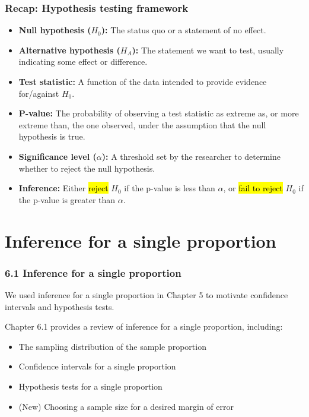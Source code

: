 \documentclass[t,compress,mathserif]{beamer}
\begin{document}
\begin{frame}
\frametitle{Recap: Hypothesis testing framework}

\begin{itemize}
\item \textbf{Null hypothesis ($H_0$):} The status quo or a statement of no effect.
\item \textbf{Alternative hypothesis ($H_A$):} The statement we want to test, usually indicating some effect or difference.
\item \textbf{Test statistic:} A function of the data intended to provide evidence for/against $H_0$.
\item \textbf{P-value:} The probability of observing a test statistic as extreme as, or more extreme than, the one observed, under the assumption that the null hypothesis is true.
\item \textbf{Significance level ($\alpha$):} A threshold set by the researcher to determine whether to reject the null hypothesis.
\item \textbf{Inference:} Either \hl{reject} $H_0$ if the p-value is less than $\alpha$, or \hl{fail to reject} $H_0$ if the p-value is greater than $\alpha$.
\end{itemize}

\end{frame}


\section{Inference for a single proportion}


\begin{frame}
\frametitle{6.1 Inference for a single proportion}
We used inference for a single proportion in Chapter 5 to motivate confidence intervals and hypothesis tests.

Chapter 6.1 provides a review of inference for a single proportion, including:
    \begin{itemize}
        \item The sampling distribution of the sample proportion
        \item Confidence intervals for a single proportion
        \item Hypothesis tests for a single proportion
        \item (New) Choosing a sample size for a desired margin of error
    \end{itemize}

\end{frame}
\end{document}
